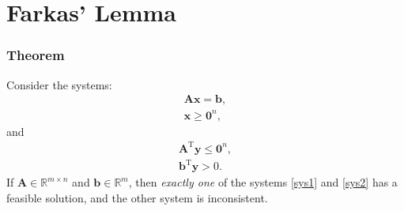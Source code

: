 \documentclass[12pt, a4paper]{article}
\begin{document}
\section{Farkas' Lemma}
\subsubsection*{Theorem}
Consider the systems:
\begin{equation}
\begin{split}
\bm{Ax = b},\\
\bm{x}\geq \bm{0}^n,
\label{sys1}
\end{split}
\end{equation}
and
\begin{equation}
\begin{split}
\bm{A}^\text{T}\bm{y}\leq \bm{0}^n,\\
\bm{b}^\text{T}\bm{y}>0.
\label{sys2}
\end{split}
\end{equation}
If $\bm{A}\in \mathbb{R}^{m\times n}$ and $\bm{b} \in \mathbb{R}^m$, then \textit{exactly one} of the systems \ref{sys1} and \ref{sys2} has a feasible solution, and the other system is inconsistent.
\end{document}
